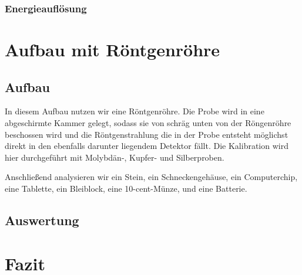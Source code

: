 \documentclass[a4paper,14pt]{article}
\begin{document}
\subsubsection{Energieauflösung}


\section{Aufbau mit Röntgenröhre}
\subsection{Aufbau}
In diesem Aufbau nutzen wir eine Röntgenröhre. Die Probe wird in eine abgeschirmte Kammer gelegt, sodass sie von schräg unten von der Röngenröhre beschossen wird und die Röntgenstrahlung die in der Probe entsteht möglichst direkt in den ebenfalls darunter liegendem Detektor fällt. Die Kalibration wird hier durchgeführt mit Molybdän-, Kupfer- und Silberproben.

Anschließend analysieren wir ein Stein, ein Schneckengehäuse, ein Computerchip, eine Tablette, ein Bleiblock, eine 10-cent-Münze, und eine Batterie.

\subsection{Auswertung}

\section{Fazit}
	
	
\end{document}
